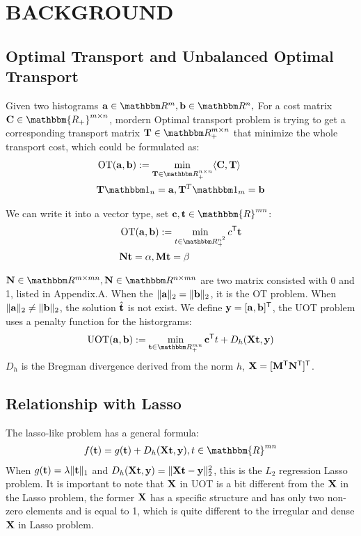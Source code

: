 \section{BACKGROUND}
\subsection{Optimal Transport and Unbalanced Optimal Transport}
Given two histograms $\ma\in \R^{m}, \mb \in \R^{n},$ For a cost matrix $\C \in \mathbbm{R_{+}}^{m \times n}$, mordern Optimal transport problem is trying to get a corresponding transport matrix $\T \in \R_{+}^{m \times n}$ that minimize the whole transport cost, which could be formulated as:
\begin{equation}
\begin{split}
&\operatorname{OT}(\ma,\mb) := \min_{ \T \in \R_{+}^{n \times n}} \langle \C, \T \rangle \\
& \mathbf{T} \one_n= \ma, \mathbf{T}^{T}\one_m = \mb
\end{split}
\end{equation}

We can write it into a vector type, set $\vc,\vt \in \mathbbm{R}^{mn}$:
\begin{equation}
\begin{split}
&\operatorname{OT}(\ma,\mb) := \min_{t \in \R_{+}^{n^2}} c^{\tranT}\vt \\
& \mathbf{N}\vt = \alpha, \mathbf{M}\vt = \beta
\end{split}
\end{equation}

$\mathbf{N} \in \R^{m \times mn}, \mathbf{N} \in \R^{n \times mn}$ are two matrix consisted with 0 and 1, listed in Appendix.A. When the $\|\mathbf{a}\|_2 = \|\mathbf{b}\|_2$, it is the OT problem. When $\|\mathbf{a}\|_2 \neq \|\mathbf{b}\|_2$, the solution $\hat{\mathbf t}$ is not exist. We define $\mathbf y = [\mathbf{a}, \mathbf{b}]^{\mathsf T}$, the UOT problem uses a penalty function for the historgrams: 
\begin{equation}
\label{eq:uot}
\operatorname{UOT}(\ma,\mb) := \min_{\vt \in \R_{+}^{mn}} \vc^{\tranT}t + D_h(\X\vt,\y)
\end{equation}
$D_h$ is the Bregman divergence derived from the norm $h$, $\mathbf{X} = [\mathbf{M}^{\mathsf T} \mathbf{N}^{\mathsf T}]^{\mathsf T}$. 

\subsection{Relationship with Lasso}
The lasso-like problem has a general formula:
$$
\begin{aligned}
f(\vt) = g(\vt) + D_h(\X \vt,\y), t\in \mathbbm{R}^{mn}
\end{aligned}
$$
When $g(\mathbf t) = \lambda \|\mathbf t\|_1$ and $D_h(\mathbf{X} \mathbf t,\mathbf y) = \|\mathbf{X} \mathbf t-\mathbf y\|_2^2$, this is the $L_2$ regression Lasso problem. It is important to note that $\mathbf{X}$ in UOT is a bit different from the $\mathbf{X}$ in the Lasso problem, the former $\mathbf{X}$ has a specific structure and has only two non-zero elements and is equal to 1, which is quite different to the irregular and dense $\mathbf{X}$ in Lasso problem.


